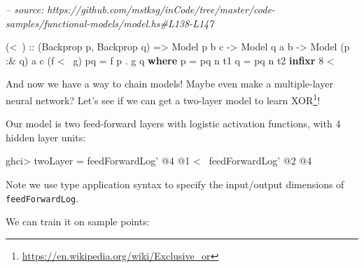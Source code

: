 \documentclass[]{article}
\newenvironment{Shaded}{}{}
\newcommand{\CommentTok}[1]{\textcolor[rgb]{0.38,0.63,0.69}{\textit{#1}}}
\newcommand{\DataTypeTok}[1]{\textcolor[rgb]{0.56,0.13,0.00}{#1}}
\newcommand{\DecValTok}[1]{\textcolor[rgb]{0.25,0.63,0.44}{#1}}
\newcommand{\FunctionTok}[1]{\textcolor[rgb]{0.02,0.16,0.49}{#1}}
\newcommand{\KeywordTok}[1]{\textcolor[rgb]{0.00,0.44,0.13}{\textbf{#1}}}
\newcommand{\NormalTok}[1]{#1}
\newcommand{\OtherTok}[1]{\textcolor[rgb]{0.00,0.44,0.13}{#1}}
\renewcommand{\href}[2]{#2\footnote{\url{#1}}}
\begin{document}
\begin{Shaded}
\begin{Highlighting}[]
\CommentTok{-- source: https://github.com/mstksg/inCode/tree/master/code-samples/functional-models/model.hs#L138-L147}

\NormalTok{(}\FunctionTok{<~}\NormalTok{)}
\OtherTok{    ::}\NormalTok{ (}\DataTypeTok{Backprop}\NormalTok{ p, }\DataTypeTok{Backprop}\NormalTok{ q)}
    \OtherTok{=>} \DataTypeTok{Model}\NormalTok{  p       b c}
    \OtherTok{->} \DataTypeTok{Model}\NormalTok{       q  a b}
    \OtherTok{->} \DataTypeTok{Model}\NormalTok{ (p }\FunctionTok{:&}\NormalTok{ q) a c}
\NormalTok{(f }\FunctionTok{<~}\NormalTok{ g) pq }\FunctionTok{=}\NormalTok{ f p }\FunctionTok{.}\NormalTok{ g q}
  \KeywordTok{where}
\NormalTok{    p }\FunctionTok{=}\NormalTok{ pq }\FunctionTok{^^.}\NormalTok{ t1}
\NormalTok{    q }\FunctionTok{=}\NormalTok{ pq }\FunctionTok{^^.}\NormalTok{ t2}
\KeywordTok{infixr} \DecValTok{8} \FunctionTok{<~}
\end{Highlighting}
\end{Shaded}

And now we have a way to chain models! Maybe even make a multiple-layer neural
network? Let's see if we can get a two-layer model to learn
\href{https://en.wikipedia.org/wiki/Exclusive_or}{XOR}!

Our model is two feed-forward layers with logistic activation functions, with 4
hidden layer units:

\begin{Shaded}
\begin{Highlighting}[]
\NormalTok{ghci}\FunctionTok{>}\NormalTok{ twoLayer }\FunctionTok{=}\NormalTok{ feedForwardLog' }\FunctionTok{@}\DecValTok{4} \FunctionTok{@}\DecValTok{1} \FunctionTok{<~}\NormalTok{ feedForwardLog' }\FunctionTok{@}\DecValTok{2} \FunctionTok{@}\DecValTok{4}
\end{Highlighting}
\end{Shaded}

Note we use type application syntax to specify the input/output dimensions of
\texttt{feedForwardLog\textquotesingle{}}.

We can train it on sample points:

\begin{Shaded}
\end{Shaded}
\end{document}
